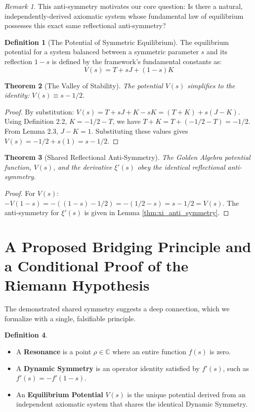 \documentclass{article}
\theoremstyle{plain}
\newtheorem{theorem}{Theorem}[section]
\theoremstyle{definition}
\newtheorem{definition}[theorem]{Definition}
\theoremstyle{remark}
\newtheorem*{remark}{Remark}
\begin{document}
\begin{remark}
This anti-symmetry motivates our core question: Is there a natural, independently-derived axiomatic system whose fundamental law of equilibrium possesses this exact same reflectional anti-symmetry?
\end{remark}

\begin{definition}[The Potential of Symmetric Equilibrium]
The equilibrium potential for a system balanced between a symmetric parameter $s$ and its reflection $1-s$ is defined by the framework's fundamental constants as:
$$V(s) = T + sJ + (1-s)K$$
\end{definition}

\begin{theorem}[The Valley of Stability]
The potential $V(s)$ simplifies to the identity: $V(s) \equiv s - 1/2$.
\end{theorem}
\begin{proof}
By substitution: $V(s) = T + sJ + K - sK = (T+K) + s(J-K)$. Using Definition 2.2, $K=-1/2-T$, we have $T+K = T+(-1/2-T) = -1/2$. From Lemma 2.3, $J-K=1$. Substituting these values gives $V(s) = -1/2 + s(1) = s - 1/2$.
\end{proof}

\begin{theorem}[Shared Reflectional Anti-Symmetry]
The Golden Algebra potential function, $V(s)$, and the derivative $\xi'(s)$ obey the identical reflectional anti-symmetry.
\end{theorem}
\begin{proof}
For $V(s)$: $-V(1-s) = -((1-s) - 1/2) = -(1/2 - s) = s - 1/2 = V(s)$. The anti-symmetry for $\xi'(s)$ is given in Lemma \ref{thm:xi_anti_symmetry}.
\end{proof}

\section{A Proposed Bridging Principle and a Conditional Proof of the Riemann Hypothesis}
The demonstrated shared symmetry suggests a deep connection, which we formalize with a single, falsifiable principle.

\begin{definition}
\begin{itemize}
    \item A \textbf{Resonance} is a point $\rho \in \mathbb{C}$ where an entire function $f(s)$ is zero.
    \item A \textbf{Dynamic Symmetry} is an operator identity satisfied by $f'(s)$, such as $f'(s) = -f'(1-s)$.
    \item An \textbf{Equilibrium Potential} $V(s)$ is the unique potential derived from an independent axiomatic system that shares the identical Dynamic Symmetry.
\end{itemize}
\end{definition}
\end{document}
